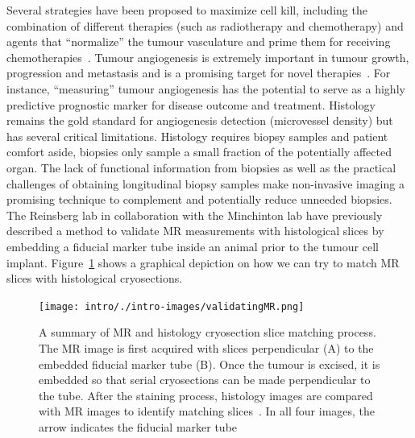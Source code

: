Several strategies have been proposed to maximize cell kill, including the combination of different therapies (such as radiotherapy and chemotherapy) and agents that ``normalize'' the tumour vasculature and prime them for receiving chemotherapies~\cite{Jain:2005uv}.
Tumour	angiogenesis is extremely important in tumour growth, progression and metastasis and is a promising target for novel therapies~\cite{Miles:2000wq}.
For instance, ``measuring'' tumour	angiogenesis has the potential to serve as a highly predictive prognostic marker for disease outcome and treatment.
Histology remains the gold standard for angiogenesis detection (microvessel density) but has several critical limitations.
Histology requires biopsy samples and patient comfort aside, biopsies only sample a small fraction of the potentially affected organ.
The lack of functional information from biopsies as well as the practical challenges of	obtaining longitudinal biopsy samples make non-invasive imaging a promising technique to complement and potentially reduce unneeded biopsies.
The Reinsberg lab in collaboration with the	Minchinton lab have previously described a method to validate MR measurements with histological	slices by embedding a fiducial marker tube inside an animal prior to the tumour cell implant. 
Figure~\ref{validatingMR} shows a graphical depiction on how  we can try to match MR slices with histological cryosections.	

\begin{figure}[htbp]		
	\begin{center}		
	\texttt{[image: intro/./intro-images/validatingMR.png]}		
	\caption{A summary of MR and histology cryosection slice matching process.
	The MR image is first acquired with slices perpendicular (A) to the embedded fiducial marker tube (B).
	Once the tumour is excised, it is embedded so that serial cryosections can be made perpendicular to the tube.
	After the staining process, histology images are compared with MR images to identify matching slices~\cite{Bains:2009ws}.
	In all four images, the arrow indicates the	fiducial marker tube}		
	\label{validatingMR}
	\end{center}	
\end{figure}	

